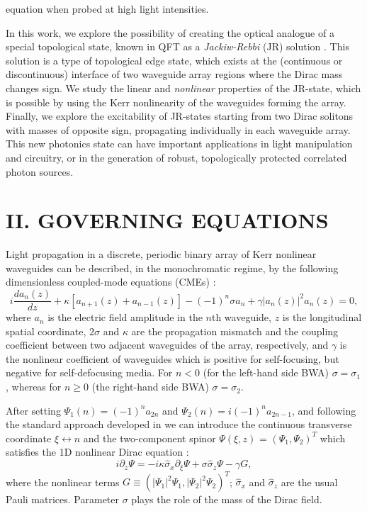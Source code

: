 \documentclass[twocolumn,aps, prl,showpacs]{revtex4}
\newcommand{\de}{\partial}
\newcommand{\eq}[2]{\begin{equation} \label{#1} #2 \end{equation}}
\begin{document}
equation when probed at high light intensities.

In this work, we explore the possibility of creating the optical analogue of a special topological state, known in QFT as a {\em Jackiw-Rebbi} (JR) solution \cite{jackiw}. This solution is a type of topological edge state, which exists at the (continuous or discontinuous) interface of two waveguide array regions where the Dirac mass changes sign. We study the linear and {\em nonlinear} properties of the JR-state, which is possible by using the Kerr nonlinearity of the waveguides forming the array. Finally, we explore the excitability of JR-states starting from two Dirac solitons with masses of opposite sign, propagating individually in each waveguide array. This new photonics state can have important applications in light manipulation and circuitry, or in the generation of robust, topologically protected correlated photon sources.

\section{II. GOVERNING EQUATIONS}
\label{geq}

Light propagation in a discrete, periodic binary array of Kerr nonlinear waveguides can be described, in the monochromatic regime, by the following dimensionless coupled-mode equations (CMEs) \cite{longhi1}:
\eq{CWCM}{i\frac{da_{n}(z)}{dz}+\kappa[a_{n+1}(z)+ a_{n-1}(z)] - (-1)^{n} \sigma a_{n} +  \gamma |a_{n}(z)|^{2}a_{n}(z)=0,}
where $a_{n}$ is the electric field amplitude in the $n$th waveguide, $z$ is the longitudinal spatial coordinate, $2\sigma$ and $\kappa$ are the propagation mismatch and the coupling coefficient between two adjacent waveguides of the array, respectively, and $\gamma$ is the nonlinear coefficient of waveguides which is positive for self-focusing, but negative for self-defocusing media. For $n<0$ (for the left-hand side BWA) $\sigma =\sigma_{1}$, whereas for $n\geq0$ (the right-hand side BWA) $\sigma =\sigma_{2}$.

After setting $\Psi_{1}(n) = (-1)^{n}a_{2n}$ and $\Psi_{2}(n) = i(-1)^{n}a_{2n-1}$, and following the standard approach developed in \cite{longhi2,dreisow} we can introduce the continuous transverse coordinate $\xi \leftrightarrow n$ and the  two-component spinor $\Psi(\xi,z)$ = $(\Psi_{1},\Psi_{2})^{T}$ which satisfies the 1D nonlinear Dirac equation \cite{trandirac1}:
\eq{diracequation}{i\de_{z}\Psi = -i\kappa\hat{\sigma}_{x}\de_{\xi}\Psi + \sigma\hat{\sigma}_{z}\Psi - \gamma G,} where the nonlinear terms $G \equiv (|\Psi_{1}|^{2}\Psi_{1},|\Psi_{2}|^{2}\Psi_{2})^{T}$;  $\hat{\sigma}_{x}$ and $\hat{\sigma}_{z}$ are the usual Pauli matrices. Parameter $\sigma$ plays the role of the mass of the Dirac field.
\end{document}
